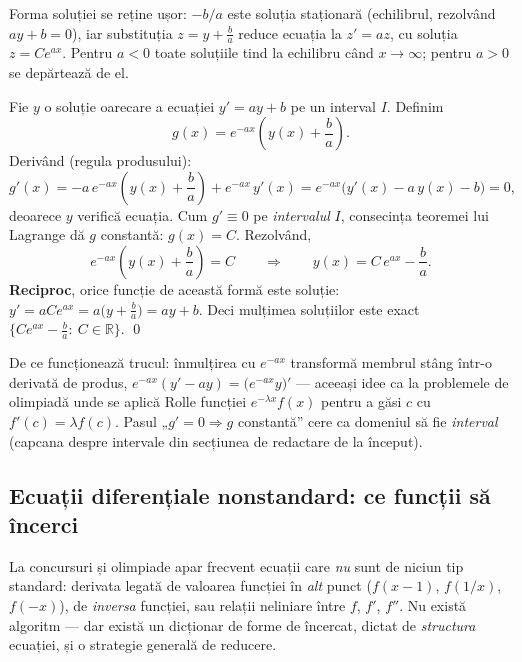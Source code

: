 \begin{obs}
Forma soluției se reține ușor: $-b/a$ este soluția staționară (echilibrul, rezolvând $ay+b=0$), iar substituția $z=y+\frac{b}{a}$ reduce ecuația la $z'=az$, cu soluția $z=Ce^{ax}$. Pentru $a<0$ toate soluțiile tind la echilibru când $x\to\infty$; pentru $a>0$ se depărtează de el.
\end{obs}

\begin{teorema}
Fie $y$ o soluție oarecare a ecuației $y'=ay+b$ pe un interval $I$. Definim
\[
g(x)=e^{-ax}\left(y(x)+\frac{b}{a}\right).
\]
Derivând (regula produsului):
\[
g'(x)=-a\,e^{-ax}\left(y(x)+\frac{b}{a}\right)+e^{-ax}\,y'(x)
=e^{-ax}\big(y'(x)-a\,y(x)-b\big)=0,
\]
deoarece $y$ verifică ecuația. Cum $g'\equiv 0$ pe \emph{intervalul} $I$, consecința teoremei lui Lagrange dă $g$ constantă: $g(x)=C$. Rezolvând,
\[
e^{-ax}\left(y(x)+\frac{b}{a}\right)=C
\qquad\Longrightarrow\qquad
y(x)=C\,e^{ax}-\frac{b}{a}.
\]
\textbf{Reciproc}, orice funcție de această formă este soluție:
$y'=aCe^{ax}=a\big(y+\frac{b}{a}\big)=ay+b$. Deci mulțimea soluțiilor este exact
$\big\{Ce^{ax}-\frac{b}{a}:\ C\in\mathbb{R}\big\}$. \qed
\end{teorema}

\begin{obs}
De ce funcționează trucul: înmulțirea cu $e^{-ax}$ transformă membrul stâng într-o derivată de produs, $e^{-ax}(y'-ay)=\big(e^{-ax}y\big)'$ --- aceeași idee ca la problemele de olimpiadă unde se aplică Rolle funcției $e^{-\lambda x}f(x)$ pentru a găsi $c$ cu $f'(c)=\lambda f(c)$. Pasul „$g'=0\Rightarrow g$ constantă'' cere ca domeniul să fie \emph{interval} (capcana despre intervale din secțiunea de redactare de la început).
\end{obs}



\subsection{Ecuații diferențiale nonstandard: ce funcții să încerci}

La concursuri și olimpiade apar frecvent ecuații care \emph{nu} sunt de niciun tip standard: derivata legată de valoarea funcției în \emph{alt} punct ($f(x-1)$, $f(1/x)$, $f(-x)$), de \emph{inversa} funcției, sau relații neliniare între $f$, $f'$, $f''$. Nu există algoritm --- dar există un dicționar de forme de încercat, dictat de \emph{structura} ecuației, și o strategie generală de reducere.

